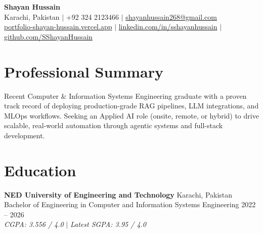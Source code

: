 \documentclass[11pt, a4paper]{article}
\begin{document}
\begin{center}
    {\huge \textbf{Shayan Hussain}} \\ \vspace{4pt}
    Karachi, Pakistan $|$ +92 324 2123466 $|$ \href{mailto:shayanhussain268@gmail.com}{shayanhussain268@gmail.com} \\
    \href{https://portfolio-shayan-hussain.vercel.app/}{portfolio-shayan-hussain.vercel.app} $|$ \href{https://linkedin.com/in/sshayanhussain}{linkedin.com/in/sshayanhussain} $|$ \href{https://github.com/SShayanHussain}{github.com/SShayanHussain}
\end{center}

\section*{Professional Summary}
Recent Computer \& Information Systems Engineering graduate with a proven track record of deploying production-grade RAG pipelines, LLM integrations, and MLOps workflows. Seeking an Applied AI role (onsite, remote, or hybrid) to drive scalable, real-world automation through agentic systems and full-stack development.

\section*{Education}
\textbf{NED University of Engineering and Technology} \hfill Karachi, Pakistan \\
Bachelor of Engineering in Computer and Information Systems Engineering \hfill 2022 -- 2026 \\
\textit{CGPA: 3.556 / 4.0} $|$ \textit{Latest SGPA: 3.95 / 4.0}

\end{document}
